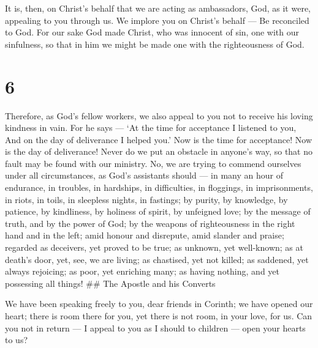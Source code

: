  It is, then, on Christ's behalf that we are acting as
ambassadors, God, as it were, appealing to you through us. We implore
you on Christ's behalf --- Be reconciled to God.  For our
sake God made Christ, who was innocent of sin, one with our sinfulness,
so that in him we might be made one with the righteousness of God.

\hypertarget{section-5}{%
\section{6}\label{section-5}}

 Therefore, as God's fellow workers, we also appeal to you
not to receive his loving kindness in vain.  For he says ---
`At the time for acceptance I listened to you, And on the day of
deliverance I helped you.' Now is the time for acceptance! Now is the
day of deliverance!  Never do we put an obstacle in anyone's
way, so that no fault may be found with our ministry.  No,
we are trying to commend ourselves under all circumstances, as God's
assistants should --- in many an hour of endurance, in troubles, in
hardships, in difficulties,  in floggings, in imprisonments,
in riots, in toils, in sleepless nights, in fastings;  by
purity, by knowledge, by patience, by kindliness, by holiness of spirit,
by unfeigned love;  by the message of truth, and by the
power of God; by the weapons of righteousness in the right hand and in
the left;  amid honour and disrepute, amid slander and
praise; regarded as deceivers, yet proved to be true;  as
unknown, yet well-known; as at death's door, yet, see, we are living; as
chastised, yet not killed;  as saddened, yet always
rejoicing; as poor, yet enriching many; as having nothing, and yet
possessing all things! \#\# The Apostle and his Converts

 We have been speaking freely to you, dear friends in
Corinth; we have opened our heart;  there is room there for
you, yet there is not room, in your love, for us.  Can you
not in return --- I appeal to you as I should to children --- open your
hearts to us?

